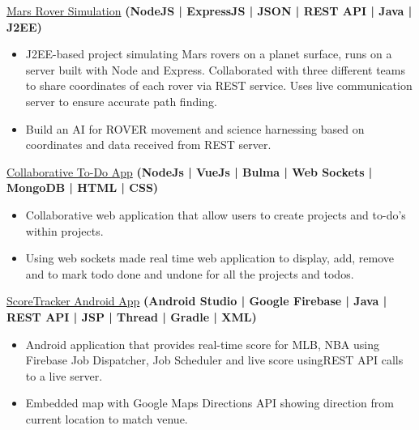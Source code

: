 \documentclass[10pt,a4paper]{article}
\begin{document}
{{{\headedsection  %
  {\href{https://github.com/parthp2/Mars-Rover-Simulation}{Mars Rover Simulation}
  \textbf{
  \small{(NodeJS | ExpressJS | JSON | REST API | Java | J2EE)}}}
  {} {%
  
    {\bodytext
    {
    \begin{itemize}
        \item J2EE-based project simulating Mars rovers on a planet surface, runs on a server built with Node and Express. Collaborated with three different teams to share coordinates of each rover via REST service. Uses live communication server to ensure accurate path finding.
        \item Build an AI for ROVER movement and science harnessing based on coordinates and data received from REST server.
    \end{itemize}}}
}

\headedsection  %
  {\href{https://github.com/parthp2/TodoApp}{Collaborative To-Do App}
  \textbf{
  \small{(NodeJs | VueJs | Bulma | Web Sockets | MongoDB | HTML | CSS)}}}
  {} {%
  
    {\bodytext
    {
    \begin{itemize}
        \item Collaborative web application that allow users to create projects and to-do's within projects.
        \item Using web sockets made real time web application to display, add, remove and to mark todo done and undone for all the projects and todos.
    \end{itemize}}}
}

\headedsection  %
  {\href{https://github.com/parthp2/ScoreTracker-CS5540}{ScoreTracker Android App}
  \textbf{
  \small{(Android Studio | Google Firebase | Java | REST API | JSP | Thread | Gradle | XML)}}}
  {} {%
  
    {\bodytext
    {
    \begin{itemize}
        \item Android application that provides real-time score for MLB, NBA using Firebase Job Dispatcher, Job Scheduler and live score usingREST API calls to a live server.
        \item Embedded map with Google Maps Directions API showing direction from current location to match venue.
    \end{itemize}}}
}

}}}
\end{document}
